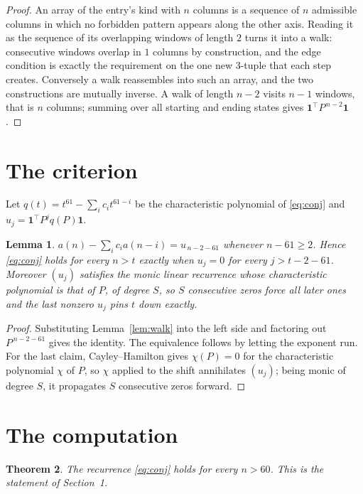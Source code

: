 \documentclass[11pt,a4paper]{article}
\theoremstyle{plain}
\newtheorem{theorem}{Theorem}
\newtheorem{lemma}[theorem]{Lemma}
\theoremstyle{definition}
\begin{document}
\begin{proof}
An array of the entry's kind with $n$ columns is a sequence of $n$ admissible columns in
which no forbidden pattern appears along the other axis. Reading it as the sequence of its
overlapping windows of length $2$ turns it into a walk: consecutive windows overlap in
$1$ columns by construction, and the edge condition is exactly the requirement on the one
new $3$-tuple that each step creates. Conversely a walk reassembles into such an array,
and the two constructions are mutually inverse. A walk of length $n-2$ visits $n-1$
windows, that is $n$ columns; summing over all starting and ending states gives
$\mathbf{1}^{\!\top}P^{\,n-2}\mathbf{1}$.
\end{proof}

\section{The criterion}

Let $q(t)=t^{61}-\sum_i c_i t^{61-i}$ be the characteristic polynomial of
\eqref{eq:conj} and $u_j=\mathbf{1}^{\!\top}P^{j}q(P)\mathbf{1}$.

\begin{lemma}\label{lem:crit}
$a(n)-\sum_i c_i a(n-i)=u_{\,n-2-61}$ whenever $n-61\ge2$. Hence
\eqref{eq:conj} holds for every $n>t$ exactly when $u_j=0$ for every
$j>t-2-61$. Moreover $(u_j)$ satisfies the monic linear recurrence whose
characteristic polynomial is that of $P$, of degree $S$, so $S$ consecutive zeros force all
later ones and the last nonzero $u_j$ pins $t$ down exactly.
\end{lemma}

\begin{proof}
Substituting Lemma~\ref{lem:walk} into the left side and factoring out
$P^{\,n-2-61}$ gives the identity. The equivalence follows by letting the exponent
run. For the last claim, Cayley--Hamilton gives $\chi(P)=0$ for the characteristic
polynomial $\chi$ of $P$, so $\chi$ applied to the shift annihilates $(u_j)$; being monic of
degree $S$, it propagates $S$ consecutive zeros forward.
\end{proof}

\section{The computation}

\begin{theorem}
The recurrence \eqref{eq:conj} holds for every $n>60$. This is the statement of
Section~1.
\end{theorem}
\end{document}
